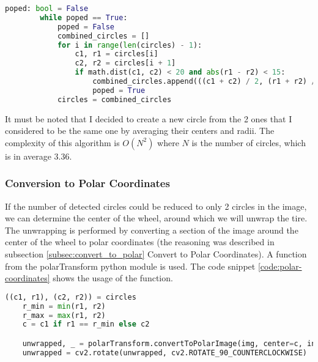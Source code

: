 \begin{lstlisting}[language=Python, label=code:heuristics-for-fircles, caption={Reducing the Number of Circles}]
    poped: bool = False
        while poped == True:
            poped = False
            combined_circles = []
            for i in range(len(circles) - 1):
                c1, r1 = circles[i]
                c2, r2 = circles[i + 1]
                if math.dist(c1, c2) < 20 and abs(r1 - r2) < 15:
                    combined_circles.append(((c1 + c2) / 2, (r1 + r2) / 2))
                    poped = True
            circles = combined_circles
\end{lstlisting}

It must be noted that I decided to create a new circle from the 2 ones that I considered to be the same one by averaging their centers and radii. The complexity of this algorithm is $O(N^2)$ where $N$ is the number of circles, which is in average 3.36.

\subsubsection{Conversion to Polar Coordinates}

If the number of detected circles could be reduced to only 2 circles in the image, we can determine the center of the wheel, around which we will unwrap the tire. The unwrapping is performed by converting a section of the image around the center of the wheel to polar coordinates (the reasoning was described in subsection \ref{subsec:convert_to_polar} Convert to Polar Coordinates). A function from the polarTransform \cite{site:polarTransform-convertToPolarImage} python module is used. The code snippet \ref{code:polar-coordinates} shows the usage of the function.

\begin{lstlisting}[language=Python, label=code:polar-coordinates, caption={Polar Coordinates}]
   ((c1, r1), (c2, r2)) = circles
    r_min = min(r1, r2)
    r_max = max(r1, r2)
    c = c1 if r1 == r_min else c2

    unwrapped, _ = polarTransform.convertToPolarImage(img, center=c, initialRadius=r_min, finalRadius=r_max, hasColor=True, order=1, useMultiThreading=True)
    unwrapped = cv2.rotate(unwrapped, cv2.ROTATE_90_COUNTERCLOCKWISE)
\end{lstlisting}

